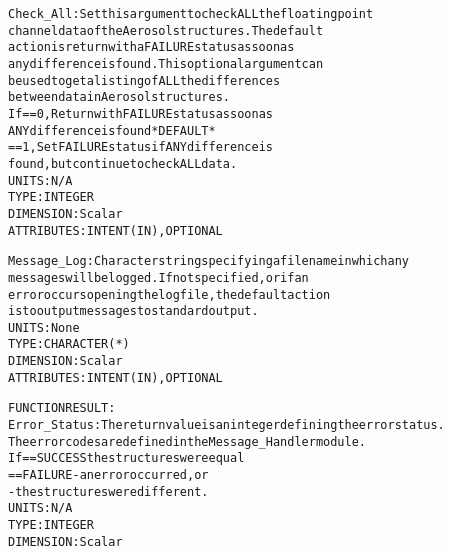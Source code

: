 \begin{alltt}
        Check_All:         Set this argument to check ALL the floating point
                           channel data of the Aerosol structures. The default
                           action is return with a FAILURE status as soon as
                           any difference is found. This optional argument can
                           be used to get a listing of ALL the differences
                           between data in Aerosol structures.
                           If == 0, Return with FAILURE status as soon as
                                    ANY difference is found  *DEFAULT*
                              == 1, Set FAILURE status if ANY difference is
                                    found, but continue to check ALL data.
                           UNITS:      N/A
                           TYPE:       INTEGER
                           DIMENSION:  Scalar
                           ATTRIBUTES: INTENT(IN), OPTIONAL
 
        Message_Log:       Character string specifying a filename in which any
                           messages will be logged. If not specified, or if an
                           error occurs opening the log file, the default action
                           is to output messages to standard output.
                           UNITS:      None
                           TYPE:       CHARACTER(*)
                           DIMENSION:  Scalar
                           ATTRIBUTES: INTENT(IN), OPTIONAL
 
  FUNCTION RESULT:
        Error_Status:      The return value is an integer defining the error status.
                           The error codes are defined in the Message_Handler module.
                           If == SUCCESS the structures were equal
                              == FAILURE - an error occurred, or
                                         - the structures were different.
                           UNITS:      N/A
                           TYPE:       INTEGER
                           DIMENSION:  Scalar
 
  \end{alltt}
